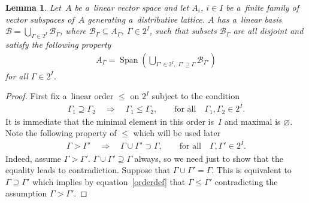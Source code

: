 \documentclass[11pt]{article}
\newtheorem{lemma}{Lemma}
\DeclareMathOperator{\Span}{Span}
\begin{document}
\begin{lemma}
\label{partlem}
Let~$A$ be a~linear vector space and let $A_i$, $i\in I$ be a~finite family of vector subspaces of~$A$ generating a~distributive lattice.
$A$ has a~linear basis $\mathcal{B}=\bigcup_{\Gamma\in2^I}\mathcal{B}_\Gamma$, where
$\mathcal{B}_\Gamma\subseteq A_\Gamma$, $\Gamma\in2^I$, such that subsets $\mathcal{B}_\Gamma$ are all disjoint and
satisfy the following property
\begin{gather}
\label{partition}
A_\Gamma=\Span\left(\bigcup_{\Gamma'\in2^I,\; \Gamma'\supseteq\Gamma}\mathcal{B}_{\Gamma'}\right)  %
\end{gather}
for all $\Gamma\in2^I$.
\end{lemma}
\begin{proof}
First f\/ix a~linear order $\leq$ on $2^I$ subject to the condition
\begin{gather}
\label{orderdef}
\Gamma_1\supseteq \Gamma_2
\quad
\Rightarrow
\quad
\Gamma_1\leq\Gamma_2,
\qquad
\text{for all}
\quad
\Gamma_1,\Gamma_2\in 2^I.
\end{gather}
It is immediate that the minimal element in this order is~$I$ and maximal is $\varnothing$.
Note the following property of $\leq$ which will be used later
\begin{gather}
\label{Order}
\Gamma>\Gamma'
\quad
\Rightarrow
\quad
\Gamma\cup\Gamma'\supset \Gamma,
\qquad
\text{for all}
\quad
\Gamma,\Gamma'\in2^I.
\end{gather}
Indeed, assume $\Gamma>\Gamma'$.
$\Gamma\cup\Gamma'\supseteq \Gamma$ always, so we need just to show that the equality leads to contradiction.
Suppose that $\Gamma\cup\Gamma'= \Gamma$.
This is equivalent to $\Gamma\supseteq\Gamma'$ which implies by equation~\eqref{orderdef} that $\Gamma\leq\Gamma'$
contradicting the assumption $\Gamma>\Gamma'$.


\end{proof}
\end{document}
